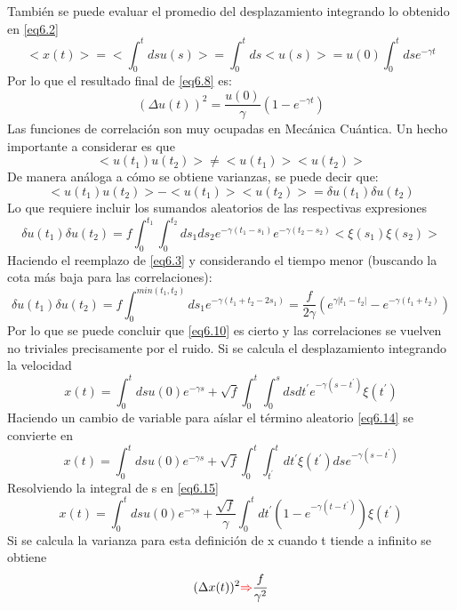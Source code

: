 \documentclass{book}
\begin{document}
También se puede evaluar el promedio del desplazamiento integrando lo obtenido en \ref{eq6.2}
\begin{equation}\label{eq6.8}<x(t)>=<\int_0^t ds u(s)>=\int_0^t ds <u(s)> =u(0)\int_0^t ds e^{-\gamma t}\end{equation}
Por lo que el resultado final de \ref{eq6.8} es:
\begin{equation}\label{eq6.9} (\Delta u(t))^2=\frac{u(0)}{\gamma}(1-e^{-\gamma t})\end{equation}
Las funciones de correlación son muy ocupadas en Mecánica Cuántica. Un hecho importante a considerar es que 
\begin{equation}\label{eq6.10} <u(t_1)u(t_2)>\neq<u(t_1)><u(t_2)>\end{equation}
De manera análoga a cómo se obtiene varianzas, se puede decir que:
\begin{equation}\label{eq6.11}<u(t_1)u(t_2)>-<u(t_1)><u(t_2)>=\delta u(t_1)\delta u(t_2)\end{equation}
Lo que requiere incluir los sumandos aleatorios de las respectivas expresiones
\begin{equation}\label{eq6.12}\delta u(t_1)\delta u(t_2)=f\int_0^{t_1}\int_0^{t_2}ds_1 ds_2 e^{-\gamma(t_1-s_1)}e^{-\gamma(t_2-s_2)}<\xi(s_1)\xi(s_2)>\end{equation}
Haciendo el reemplazo de \ref{eq6.3} y considerando el tiempo menor (buscando la cota más baja para las correlaciones):
\begin{equation}\label{eq6.13}\delta u(t_1)\delta u(t_2)=f\int_{0}^{min(t_1,t_2)}ds_1 e^{-\gamma(t_1+t_2-2s_1)}=\frac{f}{2\gamma}(e^{\gamma\lvert t_1-t_2\rvert}-e^{-\gamma(t_1+t_2)})\end{equation}
Por lo que se puede concluir que \ref{eq6.10} es cierto y las correlaciones se vuelven no triviales precisamente por el ruido.
Si se calcula el desplazamiento integrando la velocidad
\begin{equation}\label{eq6.14}x(t)=\int_0^t ds u(0)e^{-\gamma s}+\sqrt{f}\int_0^t\int_0^s ds dt^\prime e^{-\gamma(s-t^\prime)} \xi(t^\prime)\end{equation}
Haciendo un cambio de variable para aíslar el término aleatorio \ref{eq6.14} se convierte en 
\begin{equation}\label{eq6.15}x(t)=\int_0^t ds u(0)e^{-\gamma s}+\sqrt{f}\int_0^t \int_{t^\prime}^t dt^\prime \xi(t^\prime) ds e^{-\gamma (s-t^\prime)}\end{equation}
Resolviendo la integral de s en \ref{eq6.15}\begin{equation}\label{eq6.16}x(t)=\int_0^t ds u(0)e^{-\gamma s}+\frac{\sqrt{f}}{\gamma}\int_0^t d t^\prime (1-e^{-\gamma(t-t^\prime)})\xi(t^\prime)\end{equation} Si se calcula la varianza para esta definición de x cuando t tiende a infinito se obtiene
\begin{equation}\label{eq6.17} (\Delta x(t))^2 \textcolor{red}{\Rightarrow} \frac{f}{\gamma^2}\end{equation}
\end{document}
